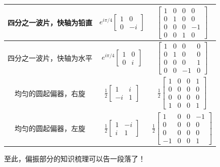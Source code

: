 \documentclass[UTF8]{ctexart}
\begin{document}
\begin{center}
\begin{tabular}{c|c|c}
		\midrule
		四分之一波片，快轴为铅直&
		$e^{i \pi / 4} \left[ \begin{array}{ll}{1} & {0} \\ {0} & {-i}\end{array}\right]$
		&
		$\left[ \begin{array}{llll}{1} & {0} & {0} & {0} \\ {0} & {1} & {0} & {0} \\ {0} & {0} & {0} & {-1} \\ {0} & {0} & {1} & {0}\end{array}\right]$\\
		
		\midrule
		四分之一波片，快轴为水平&
		$e^{i \pi / 4} \left[ \begin{array}{ll}{1} & {0} \\ {0} & {i}\end{array}\right]$
		&
		$\left[ \begin{array}{rrrr}{1} & {0} & {0} & {0} \\ {0} & {1} & {0} & {0} \\ {0} & {0} & {0} & {1} \\ {0} & {0} & {-1} & {0}\end{array}\right]$\\
		
		\midrule
		均匀的圆起偏器，右旋&
		$\frac{1}{2} \left[ \begin{array}{rr}{1} & {i} \\ {-i} & {1}\end{array}\right]$
		&
		$\frac{1}{2} \left[ \begin{array}{llll}{1} & {0} & {0} & {1} \\ {0} & {0} & {0} & {0} \\ {0} & {0} & {0} & {0} \\ {1} & {0} & {0} & {1}\end{array}\right]$\\
		
		\midrule
		均匀的圆起偏器，左旋&
		$\frac{1}{2} \left[ \begin{array}{rr}{1} & {-i} \\ {i} & {1}\end{array}\right]$
		&
		$\frac{1}{2} \left[ \begin{array}{rrrr}{1} & {0} & {0} & {-1} \\ {0} & {0} & {0} & {0} \\ {0} & {0} & {0} & {0} \\ {-1} & {0} & {0} & {1}\end{array}\right]$\\
		
		\bottomrule
	\end{tabular}
	\end{center}
	
	至此，偏振部分的知识梳理可以告一段落了！
\end{document}
